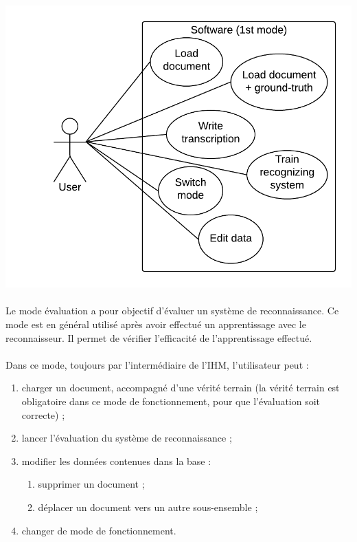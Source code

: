 \newpage

\begin{mdframed}[frametitle={Figure 2 : Diagramme de cas d'utilisation (mode apprentissage)}, innerbottommargin=10]
\begin{center}
\includegraphics[scale=0.6]{Usecase_1.png}
\end{center}
\end{mdframed}

\paragraph{}

Le mode évaluation a pour objectif d’évaluer un système de reconnaissance. Ce
mode est en général utilisé après avoir effectué un apprentissage avec le
reconnaisseur. Il permet de vérifier l’efficacité de l’apprentissage effectué.

\paragraph{}

Dans ce mode, toujours par l’intermédiaire de l’IHM, l’utilisateur peut :
\begin{enumerate}
\item charger un document, accompagné d’une vérité terrain (la vérité terrain
est obligatoire dans ce mode de fonctionnement, pour que l’évaluation soit
correcte) ;
\item lancer l’évaluation du système de reconnaissance ;
\item modifier les données contenues dans la base :
\begin{enumerate}
\item supprimer un document ;
\item déplacer un document vers un autre sous-ensemble ;
\end{enumerate}
\item changer de mode de fonctionnement.
\end{enumerate}

